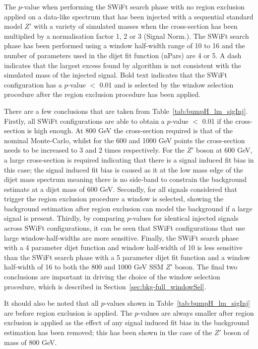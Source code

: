 \begin{table}[!ht]
\caption{\label{tab:bumpH_lm_sigInj}
  The  \bh{} \mbox{$p$-value} when performing the SWiFt search phase with no region exclusion applied
  on a data-like spectrum that has been injected with a sequential standard model $Z'$ with
  a variety of simulated masses when the cross-section has been multiplied by a normalisation factor 1, 2 or 3 (Signal Norm.).
  The SWiFt search phase has been performed using a window half-width range of 10 to 16
  and the number of parameters used in the dijet fit function (nPars) are 4 or 5.
  A dash indicates that the largest excess found by \bh{} algorithm is not consistent with the simulated mass of the injected signal.
  Bold text indicates that the SWiFt configuration has a \bh{} $p$-value $<$ 0.01
  and is selected by the window selection procedure after the region exclusion procedure has been applied. }
\end{table}

There are a few conclusions that are taken from Table~\ref{tab:bumpH_lm_sigInj}.
Firstly, all SWiFt configurations are able to obtain a \bh{} $p$-value $<$ 0.01 if the cross-section is high enough.
At 800 GeV the cross-section required is that of the nominal Monte-Carlo, whilst for the 600 and 1000 GeV points
the cross-section needs to be increased to 3 and 2 times respectively.
For the $Z'$ boson at 600 GeV, a large cross-section is required indicating that
there is a signal induced fit bias in this case;
the signal induced fit bias is caused as it at the low mass edge of the
dijet mass spectrum meaning there is no side-band to constrain the background estimate at a dijet mass of 600 GeV.
Secondly, for all signals considered that trigger the region exclusion procedure a window is selected,
showing the background estimation after region exclusion can model the background if a large signal is present.
Thirdly, by comparing \bh{} $p$-values for identical injected signals across SWiFt configurations,
it can be seen that SWiFt configurations that use large window-half-widths are more sensitive.
Finally, the SWiFt search phase with a 4 parameter dijet function and window half-width of 10 is less sensitive than the
SWiFt search phase with a 5 parameter dijet fit function and a window half-width of 16 to both the 800 and 1000 GeV SSM $Z'$ boson.
The final two conclusions are important in driving the choice of the window selection procedure, which is described in Section~\ref{sec:bkg-full_windowSel}.

It should also be noted that all \bh{} $p$-values shown in Table~\ref{tab:bumpH_lm_sigInj} are before region exclusion is applied.
The \bh{} \mbox{$p$-value}s are always smaller after region exclusion is applied
as the effect of any signal induced fit bias in the background estimation has been removed;
this has been shown in the case of the $Z'$ boson of mass of 800 GeV.

